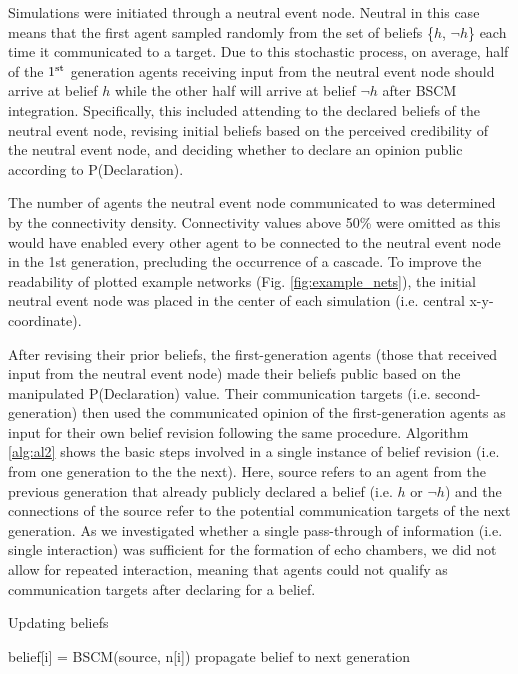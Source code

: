 \documentclass[fleqn,10pt]{wlscirep}
\begin{document}
Simulations were initiated through a neutral event node. Neutral in this case means that the first agent sampled randomly from the set of beliefs \{\(h\), \(\neg h\)\} each time it communicated to a target. Due to this stochastic process, on average, half of the \(1\textsuperscript{st}\) generation agents receiving input from the neutral event node should arrive at belief \(h\) while the other half will arrive at belief \(\neg h\) after BSCM integration. Specifically, this included attending to the declared beliefs of the neutral event node, revising initial beliefs based on the perceived credibility of the neutral event node, and deciding whether to declare an opinion public according to P(Declaration).

The number of agents the neutral event node communicated to was determined by the connectivity density. Connectivity values above 50\% were omitted as this would have enabled every other agent to be connected to the neutral event node in the 1st generation, precluding the occurrence of a cascade. To improve the readability of plotted example networks (Fig. \ref{fig:example_nets}), the initial neutral event node was  placed in the center of each simulation (i.e. central x-y-coordinate).

After revising their prior beliefs, the first-generation agents (those that received input from the neutral event node) made their beliefs public based on the manipulated P(Declaration) value. Their communication targets (i.e. second-generation) then used the communicated opinion of the first-generation agents as input for their own belief revision following the same procedure. Algorithm \ref{alg:al2} shows the basic steps involved in a single instance of belief revision (i.e. from one generation to the the next). Here, source refers to an agent from the previous generation that already publicly declared a belief (i.e. \(h\) or \(\neg h\)) and the connections of the source refer to the potential communication targets of the next generation. As we investigated whether a single pass-through of information (i.e. single interaction) was sufficient for the formation of echo chambers, we did not allow for repeated interaction, meaning that agents could not qualify as communication targets after declaring for a belief. 

\begin{algorithm}[H]
\caption{Updating beliefs}\label{update}
\begin{algorithmic}[1]

     \label{alg:al2}
             \State belief[i] = BSCM(source, n[i])
              \State propagate belief to next generation
              \EndIf
             \EndIf
        \EndFor
    \EndIf
  \EndProcedure
\end{algorithmic}
\end{algorithm}
\end{document}
